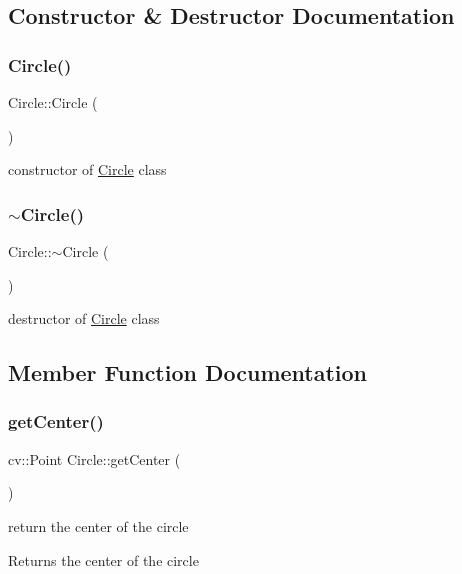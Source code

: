 \subsection{Constructor \& Destructor Documentation}
\mbox{\label{class_circle_ad1ecfcfc7bf34529c6a6d6c448bf70fe}} 
\subsubsection{\texorpdfstring{Circle()}{Circle()}}
{\footnotesize\ttfamily Circle\+::\+Circle (\begin{DoxyParamCaption}{ }\end{DoxyParamCaption})}

constructor of \mbox{\hyperlink{class_circle}{Circle}} class \mbox{\label{class_circle_ae3f30436e645d73e368e8ee55f8d1650}} 
\subsubsection{\texorpdfstring{$\sim$\+Circle()}{~Circle()}}
{\footnotesize\ttfamily Circle\+::$\sim$\+Circle (\begin{DoxyParamCaption}{ }\end{DoxyParamCaption})}

destructor of \mbox{\hyperlink{class_circle}{Circle}} class 

\subsection{Member Function Documentation}
\mbox{\label{class_circle_a60d1af499a6ad295f9f2955c4409dddd}} 
\subsubsection{\texorpdfstring{get\+Center()}{getCenter()}}
{\footnotesize\ttfamily cv\+::\+Point Circle\+::get\+Center (\begin{DoxyParamCaption}{ }\end{DoxyParamCaption})}

return the center of the circle \begin{DoxyReturn}{Returns}
the center of the circle 
\end{DoxyReturn}
\mbox{\label{class_circle_a50656c826a70e13fa75eb696a0dd3123}} 
